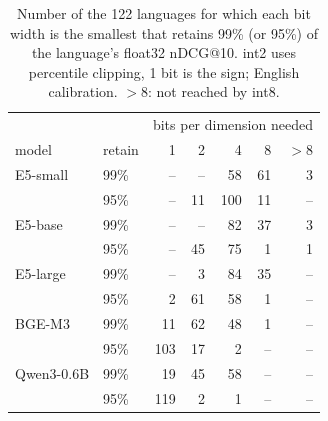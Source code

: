 \begin{table}[t]\centering\footnotesize
\begin{tabular}{llrrrrr}
\toprule
 & & \multicolumn{5}{c}{bits per dimension needed} \\
model & retain & 1 & 2 & 4 & 8 & $>$8 \\
\midrule
E5-small & 99\% & -- & -- & 58 & 61 & 3 \\
 & 95\% & -- & 11 & 100 & 11 & -- \\
E5-base & 99\% & -- & -- & 82 & 37 & 3 \\
 & 95\% & -- & 45 & 75 & 1 & 1 \\
E5-large & 99\% & -- & 3 & 84 & 35 & -- \\
 & 95\% & 2 & 61 & 58 & 1 & -- \\
BGE-M3 & 99\% & 11 & 62 & 48 & 1 & -- \\
 & 95\% & 103 & 17 & 2 & -- & -- \\
Qwen3-0.6B & 99\% & 19 & 45 & 58 & -- & -- \\
 & 95\% & 119 & 2 & 1 & -- & -- \\
\bottomrule
\end{tabular}
\caption{Number of the 122 languages for which each bit width is the smallest that retains 99\% (or 95\%) of the language's float32 nDCG@10. int2 uses percentile clipping, 1 bit is the sign; English calibration. $>$8: not reached by int8.}\label{tab:bits}
\end{table}
